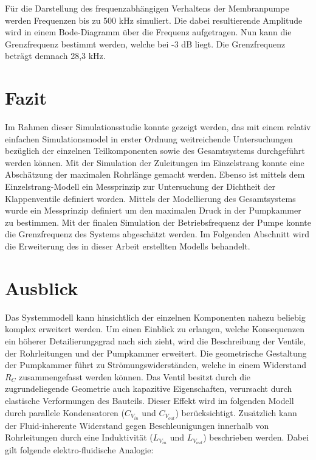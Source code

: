 \documentclass[fontsize=12pt, a4paper]{scrartcl}
\begin{document}
Für die Darstellung des frequenzabhängigen Verhaltens der Membranpumpe werden Frequenzen bis zu 500 kHz simuliert. Die dabei resultierende Amplitude wird in einem Bode-Diagramm über die Frequenz aufgetragen. Nun kann die Grenzfrequenz bestimmt werden, welche bei -3 dB liegt. Die Grenzfrequenz beträgt demnach 28,3 kHz.

\section{Fazit}

Im Rahmen dieser Simulationsstudie konnte gezeigt werden, das mit einem relativ einfachen Simulationsmodel in erster Ordnung weitreichende Untersuchungen bezüglich der einzelnen Teilkomponenten sowie des Gesamtsystems durchgeführt werden können. Mit der Simulation der Zuleitungen im Einzelstrang konnte eine Abschätzung der maximalen Rohrlänge gemacht werden. Ebenso ist mittels dem Einzelstrang-Modell ein Messprinzip zur Untersuchung der Dichtheit der Klappenventile definiert worden. Mittels der Modellierung des Gesamtsystems wurde ein Messprinzip definiert um den maximalen Druck in der Pumpkammer zu bestimmen. Mit der finalen Simulation der Betriebsfrequenz der Pumpe konnte die Grenzfrequenz des Systems abgeschätzt werden. Im Folgenden Abschnitt wird die Erweiterung des in dieser Arbeit erstellten Modells behandelt.

\section{Ausblick}

Das Systemmodell kann hinsichtlich der einzelnen Komponenten nahezu beliebig komplex erweitert werden. Um einen Einblick zu erlangen, welche Konsequenzen ein höherer Detailierungsgrad nach sich zieht, wird die Beschreibung der Ventile, der Rohrleitungen und der Pumpkammer erweitert. Die geometrische Gestaltung der Pumpkammer führt zu Strömungswiderständen, welche in einem Widerstand $R_C$ zusammengefasst werden können. Das Ventil besitzt durch die zugrundeliegende Geometrie auch kapazitive Eigenschaften, verursacht durch elastische Verformungen des Bauteils. Dieser Effekt wird im folgenden Modell durch parallele Kondensatoren ($C_{V_{in}}$ und $C_{V_{out}}$) berücksichtigt. Zusätzlich kann der Fluid-inherente Widerstand gegen Beschleunigungen innerhalb von Rohrleitungen durch eine Induktivität ($L_{V_{in}}$ und $L_{V_{out}}$) beschrieben werden. Dabei gilt folgende elektro-fluidische Analogie:
\end{document}
